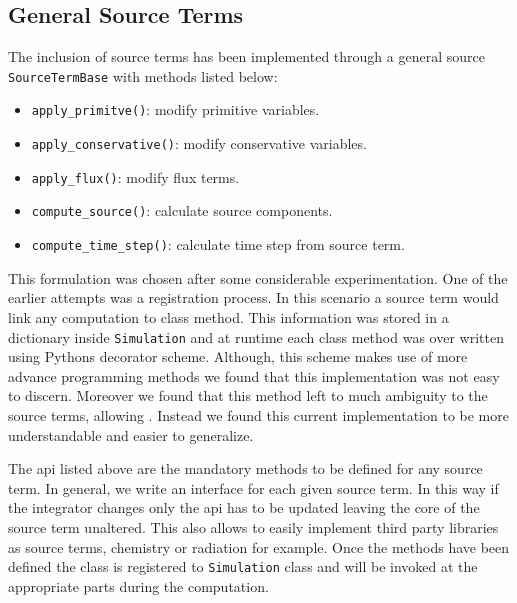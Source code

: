 \subsection{General Source Terms}
The inclusion of source terms has been implemented through a general source
\lstinline{SourceTermBase} with methods listed below:
\begin{itemize}
    \item \lstinline{apply_primitve()}: modify primitive variables.
    \item \lstinline{apply_conservative()}: modify conservative variables.
    \item \lstinline{apply_flux()}: modify flux terms.
    \item \lstinline{compute_source()}: calculate source components.
    \item \lstinline{compute_time_step()}: calculate time step from source term.
\end{itemize}
This formulation was chosen after some considerable experimentation. One of the
earlier attempts was a registration process. In this scenario a source term
would link any computation to class method. This information was stored
in a dictionary inside \lstinline{Simulation} and at runtime each class method
was over written using Pythons decorator scheme. Although, this scheme makes
use of more advance programming methods we found that this implementation was
not easy to discern. Moreover we found that this method left to much ambiguity
to the source terms, allowing . Instead we
found this current implementation to be more understandable and easier to
generalize.

The api listed above are the mandatory methods to be defined for any source
term. In general, we write an interface for each given source term. In this
way if the integrator changes only the api has to be updated leaving
the core of the source term unaltered. This also allows to easily implement
third party libraries as source terms, chemistry or radiation for example.
Once the methods have been defined the class is registered to 
\lstinline{Simulation} class and will be invoked at the appropriate parts
during the computation.

